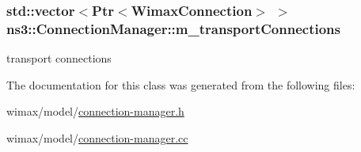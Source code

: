 \subsubsection[{\texorpdfstring{m\+\_\+transport\+Connections}{m_transportConnections}}]{\setlength{\rightskip}{0pt plus 5cm}std\+::vector$<${\bf Ptr}$<${\bf Wimax\+Connection}$>$ $>$ ns3\+::\+Connection\+Manager\+::m\+\_\+transport\+Connections\hspace{0.3cm}{\ttfamily [private]}}\hypertarget{classns3_1_1ConnectionManager_a78fdb78f7e511846b77f18a9b3959f71}{}\label{classns3_1_1ConnectionManager_a78fdb78f7e511846b77f18a9b3959f71}


transport connections 



The documentation for this class was generated from the following files\+:\begin{DoxyCompactItemize}
\item 
wimax/model/\hyperlink{connection-manager_8h}{connection-\/manager.\+h}\item 
wimax/model/\hyperlink{connection-manager_8cc}{connection-\/manager.\+cc}\end{DoxyCompactItemize}
